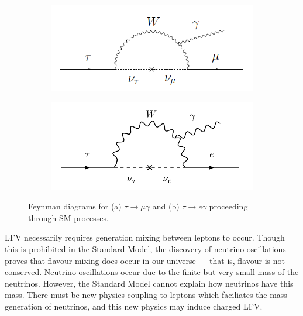 \documentclass[12pt]{thesis}  %
\begin{document}
   \begin{figure}[h]
        \centering
        \begin{subfigure}[b]{0.475\textwidth}
            \centering
            \includegraphics[width=\textwidth]{images/tauMG-feynman.png}
            \caption[]%
            {{\small}}   
            \label{fig:tauMG feynman} 
        \end{subfigure}
        \hfill
        \begin{subfigure}[b]{0.475\textwidth}  
            \centering 
            \includegraphics[width=\textwidth]{images/tauEG-feynman.png}
            \caption[]%
            {{\small}}    
            \label{fig:tauEG feynman}
        \end{subfigure}
        \caption{Feynman diagrams for (a) $\tau\to\mu\gamma$ and (b) $\tau\to e\gamma$ proceeding through SM processes.}
    \end{figure}

LFV necessarily requires generation mixing between leptons to occur. Though this is prohibited in the Standard Model, the discovery of neutrino oscillations proves that flavour mixing does occur in our universe --- that is, flavour is not conserved. Neutrino oscillations occur due to the finite but very small mass of the neutrinos. However, the Standard Model cannot explain how neutrinos have this mass. There must be new physics coupling to leptons which faciliates the mass generation of neutrinos, and this new physics may induce charged LFV.
\end{document}
